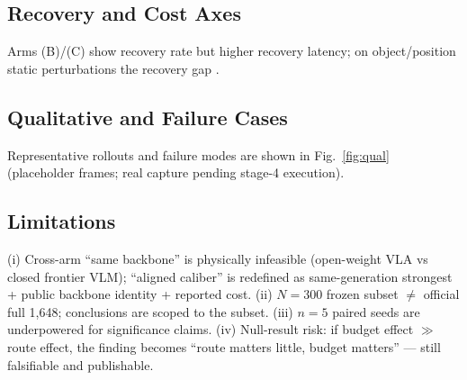\subsection{Recovery and Cost Axes}
\label{sec:recovery}
Arms (B)/(C) show  recovery rate but
 higher recovery latency; on object/position static
perturbations the recovery gap . %

\subsection{Qualitative and Failure Cases}
Representative rollouts and failure modes are shown in Fig.~\ref{fig:qual}
(placeholder frames; real capture pending stage-4 execution).

\subsection{Limitations}
\label{sec:limit}
(i) Cross-arm ``same backbone'' is physically infeasible (open-weight VLA vs
closed frontier VLM); ``aligned caliber'' is redefined as same-generation
strongest + public backbone identity + reported cost. (ii) $N{=}300$ frozen
subset $\neq$ official full 1{,}648; conclusions are scoped to the subset.
(iii) $n{=}5$ paired seeds are underpowered for significance claims.
(iv) Null-result risk: if budget effect $\gg$ route effect, the finding becomes
``route matters little, budget matters'' --- still falsifiable and publishable.
